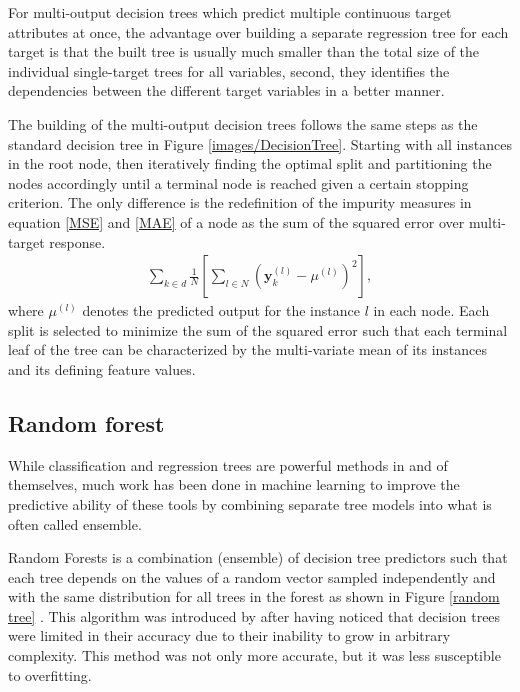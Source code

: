 For multi-output decision trees which predict multiple continuous target attributes at once, the advantage over building a separate
regression tree for each target is that the built tree is usually much smaller than the total size of the individual single-target trees for all variables, second, they identifies the dependencies between the different target variables in a better manner.

The building of the multi-output decision trees follows  the same steps as the standard decision tree in Figure \ref{images/DecisionTree}. Starting with all instances in the root node, then iteratively finding the optimal split and partitioning the nodes accordingly until a terminal node is reached given a certain stopping criterion. The only difference  is the redefinition of the impurity measures in equation \ref{MSE} and \ref{MAE} of a node as the sum of the squared error  over multi-target response. 
\begin{align}
\sum_{k\in d}\frac{1}{N}\left[\sum_{l \in N }\left(\textbf{y}_{k}^{(l)}-\mu^{(l)} \right)^2\right],
\end{align}
where $\mu^{(l)}$ denotes the predicted output for the instance $l$ in each node. Each split is selected to minimize the sum of the squared error such that each terminal leaf of the tree can be characterized by the multi-variate mean
of its instances and its defining feature values.

\subsection{Random forest}
While classification and regression trees are powerful methods in and of themselves, much work has been done in machine learning to improve the predictive ability of these tools by combining separate tree models into what is often called ensemble.

Random Forests is a combination (ensemble) of decision tree predictors such that each tree depends on the values of a random vector sampled independently and with the same distribution for all trees in the forest as shown in Figure \ref{random tree} \citep{breiman2001random}. This algorithm  was introduced by \citep{ho1995random} after having noticed that decision trees were limited in their accuracy due to their inability to grow in arbitrary complexity. This method was not only more accurate, but it was less susceptible to overfitting.

